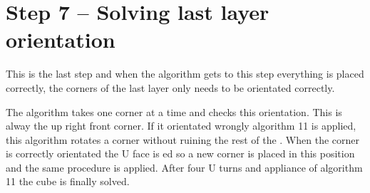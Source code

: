 \section{Step 7 -- Solving last layer orientation}
This is the last step and when the algorithm gets to this step everything is placed correctly, the corners of the last layer only needs to be orientated correctly.

The algorithm takes one corner at a time and checks this orientation. This is alway the up right front corner. If it orientated wrongly algorithm 11 is applied, this algorithm rotates a corner without ruining the rest of the \cube{}. When the corner is correctly orientated the U face is \twist{}ed so a new corner is placed in this position and the same procedure is applied. After four U turns and appliance of algorithm 11 the cube is finally solved. 



\begin{comment}
In the last layer the corners in the last layer were poisitend correctly but not oreiented. In this step will the coreners be oreinted correctly and as result it will lead to that the \rubiks{} will be solved.

This step is very simple because it there is only four corners to control and either the corner is oriented correctly or is isn't.  

The program vil first control that the front-right-up corner is oriented correctly if not the will use the an algorithm twice and after the program vil control the corner again if the corner is not oriented correctly his time the use teh algorithme and will continue with this until the corner is oriented correctly. 
Then the corner is orented correctly the program will make at up move ("U") and will control the new corner and the program will do this with every corner in the last layer until they are oriented corectly.  

\end{comment}
